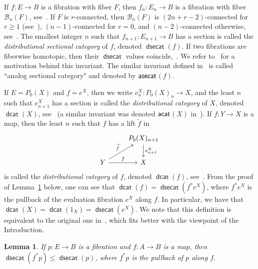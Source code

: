 \documentclass[10pt,a4paper]{amsart}
\let\scr\mathscr %
\newtheorem{lemma}{Lemma}
\theoremstyle{definition}
\DeclareMathOperator{\dsecat}{{\mathsf{dsecat}}}
\DeclareMathOperator{\dcat}{{\mathsf{dcat}}}
\def\B{{\scr B}}
\begin{document}
If $f\colon E\to B$ is a fibration with fiber $F$, then $f_n\colon E_n \to B$ is a fibration with fiber $\B_n(F)$, see~\cite{DJ,KW}. If $F$ is $r$-connected, then $\B_n(F)$ is $(2n+r-2)$-connected for $r\ge 1$ (see~\cite{KK}), $(n-1)$-connected for $r=0$, and $(n-2)$-connected otherwise, see~\cite[Section 3]{Dr}. The smallest integer $n$ such that $f_{n+1}\colon E_{n+1}\to B$ has a section is called the \emph{distributional sectional category} of $f$, denoted $\dsecat(f)$. If two fibrations are fiberwise homotopic, then their $\dsecat$ values coincide,~\cite{Ja1}. We refer to~\cite[Section 2.1]{Ja2} for a motivation behind this invariant. The similar invariant defined in~\cite{KW} is called 
``analog sectional category" and denoted by $\sf{{asecat}}$$(f)$. 

If $E = P_0(X)$ and $f=e^X$, then we write
$e_n^X \colon P_0(X)_n \to X$, and the least $n$ such that $e_{n+1}^X$ has a section is called the \emph{distributional category} of $X$, denoted $\dcat(X)$, see~\cite{DJ} (a similar invariant was denoted $\sf{{acat}}$$(X)$ in~\cite{KW}). If $f\colon Y \to X$
is a map, then the least $n$ such that $f$ has a lift $\widetilde f$ in
\[
\begin{tikzcd}[contains/.style = {draw=none,"\in" description,sloped}]
&
P_0(X)_{n+1} \arrow{d}{e_{n+1}^X}
\\
Y  \arrow{r}{f} \arrow{ur}{\widetilde{f}}
&
X
\end{tikzcd}
\]
is called the \emph{distributional category} of $f$, denoted $\dcat(f)$, see~\cite{Dr,Ja2}. From the proof of Lemma~\ref{lem:dsecat1} below, one can see that $\dcat(f)=\dsecat(f^*e^X)$, where $f^*e^X$ is the pullback of the evaluation fibration $e^X$ along $f$. In particular, we have that $\dcat(X)=\dcat(1_X)=\dsecat(e^X)$.
We note that this definition is equivalent to the original one in~\cite{DJ}, which fits better with the viewpoint of the Introduction.

\begin{lemma}\label{lem:dsecat1}
    If $p:E\to B$ is a fibration and $f:A\to B$ is a map, then $\dsecat(f^*p)\le\dsecat(p)$, where $f^*p$ is the pullback of $p$ along $f$.
\end{lemma}
\end{document}
